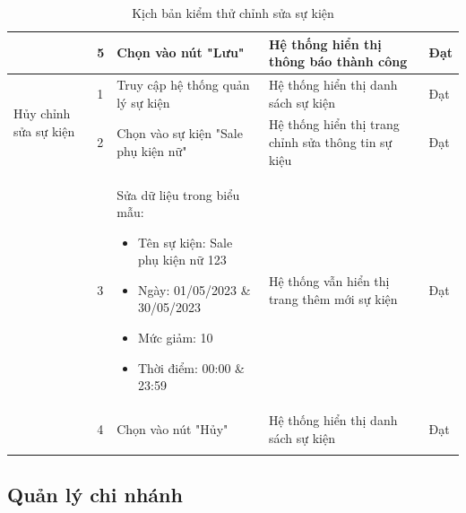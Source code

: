 {\begin{longtable}{| p{2.5cm}| p{1cm}| p{5.5cm}| p{4.5cm} | p{1.5cm} |}
        \cline{2-5}
                                                      & 5                                            & Chọn vào nút "Lưu"                                             & Hệ thống hiển thị thông báo thành công                                       & Đạt             \\
        \hline
        \multirow[t]{2}{2.5cm}{Hủy chỉnh sửa sự kiện} & 1                                            & Truy cập hệ thống quản lý sự kiện                              & Hệ thống hiển thị danh sách sự kiện                                          & Đạt             \\
        \cline{2-5}
                                                      & 2                                            & Chọn vào sự kiện "Sale phụ kiện nữ"                            & Hệ thống hiển thị trang chỉnh sửa thông tin sự kiệu                          & Đạt             \\
        \cline{2-5}
                                                      & 3                                            & Sửa dữ liệu trong biểu mẫu:
        \begin{itemize}
            \item Tên sự kiện: Sale phụ kiện nữ 123
            \item Ngày: 01/05/2023 \& 30/05/2023
            \item Mức giảm: 10
            \item Thời điểm: 00:00 \& 23:59
        \end{itemize}       & Hệ thống vẫn hiển thị trang thêm mới sự kiện & Đạt                                                                                                                                                                                       \\
        \cline{2-5}
                                                      & 4                                            & Chọn vào nút "Hủy"                                             & Hệ thống hiển thị danh sách sự kiện                                          & Đạt             \\
        \hline
        \caption{Kịch bản kiểm thử chỉnh sửa sự kiện}
    \end{longtable}
}


\subsection{Quản lý chi nhánh}
